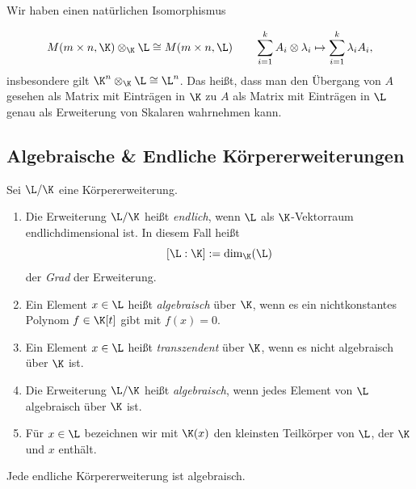 \documentclass[11pt, a4paper]{article}
\begin{document}
\begin{example} Wir haben einen natürlichen Isomorphismus 

$$M(m\times n, \K) \otimes_\K \L \cong M(m\times n, \L) \qquad \sum_{i=1}^k A_i \otimes \lambda_i \mapsto \sum_{i=1}^k \lambda_i A_i,$$
        insbesondere gilt $\K^n \otimes_\K \L \cong \L^n$. Das heißt, dass man den Übergang von $A$ gesehen als Matrix mit Einträgen in $\K$ zu $A$ als Matrix mit Einträgen in $\L$ genau als Erweiterung von Skalaren wahrnehmen kann.
\end{example}









\subsection{Algebraische \& Endliche Körpererweiterungen}

\begin{definition} \Theorem
    Sei $\L/\K$ eine Körpererweiterung.
    \begin{enumerate}[label=(\roman*)]
        \item Die Erweiterung $\L/\K$ heißt \emph{endlich}, wenn $\L$ als $\K$-Vektorraum endlichdimensional ist. In diesem Fall heißt
        $$[\L:\K] := \dim_\K(\L)$$
        der \emph{Grad} der Erweiterung.
        \item Ein Element $x \in \L$ heißt \emph{algebraisch} über $\K$, wenn es ein nichtkonstantes Polynom $f \in \K[t]$ gibt mit $f(x) = 0$.
        \item Ein Element $x \in \L$ heißt \emph{transzendent} über $\K$, wenn es nicht algebraisch über $\K$ ist.
        \item Die Erweiterung $\L/\K$ heißt \emph{algebraisch}, wenn jedes Element von $\L$ algebraisch über $\K$ ist.
        \item Für $x \in \L$ bezeichnen wir mit $\K(x)$ den kleinsten Teilkörper von $\L$, der $\K$ und $x$ enthält.
    \end{enumerate}
\end{definition}

\begin{mdbox}
\begin{lemma} \Theorem
    Jede endliche Körpererweiterung ist algebraisch.
\end{lemma}
\end{mdbox}
\end{document}
